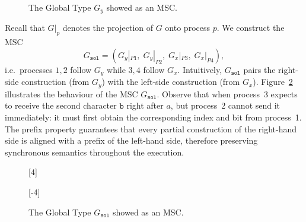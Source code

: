 \begin{example}
\begin{figure}[!ht]
\centering
\begin{msc}[draw frame=none, draw head=none, msc keyword=, head height=0px, label distance=0.5ex, foot height=0px, foot distance=0px]{}



\end{msc}
\caption{The Global Type $G_y$ showed as an MSC.}
\label{fig:exmp-my}
\end{figure}

Recall that $G|_p$ denotes the projection of $G$ onto process $p$. We
construct the MSC
$$
  G_{\texttt{sol}} = (G_y|_{P1},\; G_y|_{P2},\; G_x|_{P3},\; G_x|_{P4}),
$$
i.e.\ processes $1,2$ follow $G_y$ while $3,4$ follow $G_x$.
Intuitively, $G_{\texttt{sol}}$ pairs the right-side construction (from $G_y$)
with the left-side construction (from $G_x$). 
Figure~\ref{fig:exmp-msol} illustrates the behaviour of the MSC
$G_{\texttt{sol}}$. Observe that when process~3 expects to receive the
second character $\texttt{b}$ right after $a$, 
but process~2 cannot send it immediately:
it must first obtain the corresponding index and bit from process~1.
The prefix property guarantees
that every partial construction of the right-hand side is aligned with
a prefix of the left-hand side, therefore preserving synchronous
semantics throughout the execution.

\begin{figure}[!ht]
\centering
\begin{msc}[draw frame=none, draw head=none, msc keyword=, head height=0px, label distance=0.5ex, foot height=0px, foot distance=0px]{}

	\nextlevel

	\nextlevel
	[-4]
	\nextlevel
	
\end{msc}
\caption{The Global Type $G_\texttt{sol}$ showed as an MSC.}
\label{fig:exmp-msol}
\end{figure}

\end{example}


